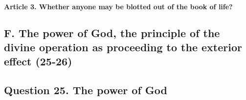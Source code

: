 \documentclass{ucetd}
\begin{document}
\paragraph{Article 3. Whether anyone may be blotted out of the book of life?}
\subsection{F. The power of God, the principle of the divine operation as proceeding to the exterior effect (25-26)}
\subsection{Question 25. The power of God}
\end{document}
